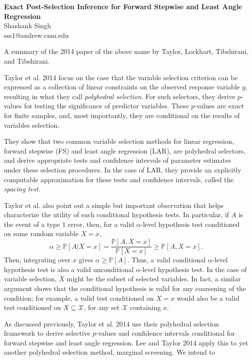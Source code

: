 \documentclass{article}
\newcommand{\X}{\mathcal{X}}                        %
\newcommand{\pr}{\mathbb{P}}                        %
\begin{document}
\begin{center}
{\bf\Large Exact Post-Selection Inference for Forward Stepwise and Least Angle
Regression}\\
Shashank Singh\\
sss1@andrew.cmu.edu\\
\end{center}

A summary of the 2014 paper of the above name by Taylor, Lockhart, Tibshirani,
and Tibshirani.

Taylor et al. 2014 focus on the case that the variable selection criterion can
be expressed as a collection of linear constraints on the observed response
variable $y$, resulting in what they call \emph{polyhedral selection}. For such
selectors, they derive $p$-values for testing the significance of predictor
variables. These $p$-values are exact for finite samples, and, most
importantly, they are conditional on the results of variables selection.

They show that two common variable selection methods for linear regression,
forward stepwise (FS) and least angle regression (LAR), are polyhedral
selectors, and derive appropriate tests and confidence intervals of parameter
estimates under these selection procedures. In the case of LAR, they provide an
explicitly computable approximation for these tests and confidence intervals,
called the \emph{spacing test}.

Taylor et al. also point out a simple but important observation that helps
characterize the utility of such conditional hypothesis tests. In
particular, if $A$ is the event of a type 1 error, then, for a valid
$\alpha$-level hypothesis test conditioned on some random variable $X = x$,
\[\alpha \geq \pr\left[ A | X = x \right]
    = \frac{\pr\left[ A,X = x \right]}{\pr\left[ X = x \right]}
    \geq \pr\left[ A,X = x \right].\]
Then, integrating over $x$ gives $\alpha \geq \pr\left[ A \right]$. Thus, a
valid conditional $\alpha$-level hypothesis test is also a valid unconditional
$\alpha$-level hypothesis test. In the case of variable selection, $X$ might be
the subset of selected variables. In fact, a similar argument shows that the
conditional hypothesis is valid for any coarsening of the condition; for
example, a valid test conditioned on $X = x$ would also be a valid test
conditioned on $X \subseteq \X$, for any set $\X$ containing $x$.

As discussed previously, Taylor et al. 2014 use their polyhedral selection
framework to derive selective $p$-values and confidence intervals conditional
for forward stepwise and least angle regression. Lee and Taylor 2014 apply this
to yet another polyhedral selection method, marginal screening. We intend to 
\end{document}
